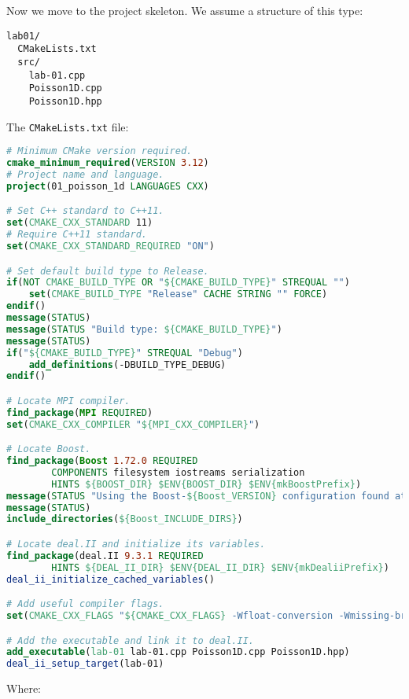 \noindent
Now we move to the project skeleton. We assume a structure of this type:
\begin{lstlisting}
lab01/
  CMakeLists.txt
  src/
    lab-01.cpp
    Poisson1D.cpp
    Poisson1D.hpp\end{lstlisting}
The \texttt{CMakeLists.txt} file:
\begin{lstlisting}[mathescape=false,language=CMake]
# Minimum CMake version required.
cmake_minimum_required(VERSION 3.12)
# Project name and language.
project(01_poisson_1d LANGUAGES CXX)

# Set C++ standard to C++11.
set(CMAKE_CXX_STANDARD 11)
# Require C++11 standard.
set(CMAKE_CXX_STANDARD_REQUIRED "ON")

# Set default build type to Release.
if(NOT CMAKE_BUILD_TYPE OR "${CMAKE_BUILD_TYPE}" STREQUAL "")
    set(CMAKE_BUILD_TYPE "Release" CACHE STRING "" FORCE)
endif()
message(STATUS)
message(STATUS "Build type: ${CMAKE_BUILD_TYPE}")
message(STATUS)
if("${CMAKE_BUILD_TYPE}" STREQUAL "Debug")
    add_definitions(-DBUILD_TYPE_DEBUG)
endif()

# Locate MPI compiler.
find_package(MPI REQUIRED)
set(CMAKE_CXX_COMPILER "${MPI_CXX_COMPILER}")

# Locate Boost.
find_package(Boost 1.72.0 REQUIRED
        COMPONENTS filesystem iostreams serialization
        HINTS ${BOOST_DIR} $ENV{BOOST_DIR} $ENV{mkBoostPrefix})
message(STATUS "Using the Boost-${Boost_VERSION} configuration found at ${Boost_DIR}")
message(STATUS)
include_directories(${Boost_INCLUDE_DIRS})

# Locate deal.II and initialize its variables.
find_package(deal.II 9.3.1 REQUIRED
        HINTS ${DEAL_II_DIR} $ENV{DEAL_II_DIR} $ENV{mkDealiiPrefix})
deal_ii_initialize_cached_variables()

# Add useful compiler flags.
set(CMAKE_CXX_FLAGS "${CMAKE_CXX_FLAGS} -Wfloat-conversion -Wmissing-braces -Wnon-virtual-dtor")

# Add the executable and link it to deal.II.
add_executable(lab-01 lab-01.cpp Poisson1D.cpp Poisson1D.hpp)
deal_ii_setup_target(lab-01)
\end{lstlisting}
Where:
